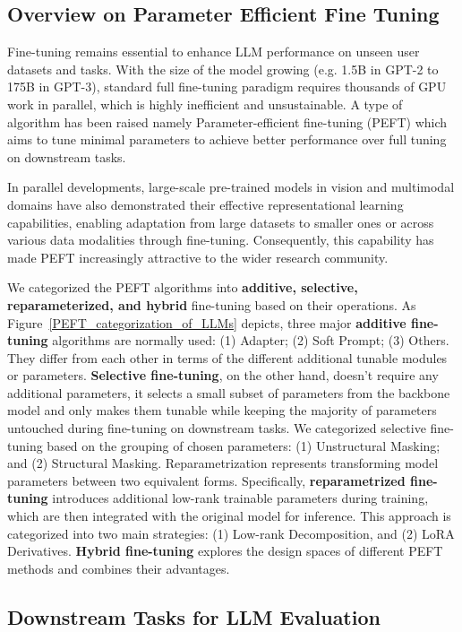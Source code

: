 \subsection{Overview on Parameter Efficient Fine Tuning}
\label{sec:backgroundofpeft}
Fine-tuning remains essential to enhance LLM performance on unseen user datasets and tasks. With the size of the model growing (e.g. 1.5B in GPT-2 to 175B in GPT-3), standard full fine-tuning
paradigm requires thousands of GPU work in parallel, which is highly inefficient and unsustainable. A type of algorithm has been raised namely Parameter-efficient fine-tuning (PEFT) which aims to tune minimal parameters to achieve better performance over full tuning on downstream tasks.

In parallel developments, large-scale pre-trained models in vision and multimodal domains have also demonstrated their effective representational learning capabilities, enabling adaptation from large datasets to smaller ones or across various data modalities through fine-tuning. Consequently, this capability has made PEFT increasingly attractive to the wider research community.


We categorized the PEFT algorithms into \textbf{additive, selective, reparameterized, and hybrid} fine-tuning based on their operations. As Figure~\ref{PEFT_categorization_of_LLMs} depicts, three major \textbf{additive fine-tuning} algorithms are normally used: (1) Adapter; (2) Soft Prompt; (3) Others. They differ from each other in terms of the different additional tunable modules or parameters. \textbf{Selective fine-tuning}, on the other hand, doesn't require any additional parameters, it selects a small subset of parameters from the backbone model and only makes them tunable while keeping the majority of parameters untouched during fine-tuning on downstream tasks. We categorized selective fine-tuning based on the grouping of chosen parameters: (1) Unstructural Masking; and (2) Structural Masking. Reparametrization represents transforming model parameters between two equivalent forms. Specifically, \textbf{reparametrized fine-tuning} introduces additional low-rank trainable parameters during training, which are then integrated with the original model for inference. This approach is categorized into two main strategies: (1) Low-rank Decomposition, and (2) LoRA Derivatives. 
\textbf{Hybrid fine-tuning} explores the design spaces of different PEFT methods and combines their advantages.

\subsection{Downstream Tasks for LLM Evaluation}
\label{sec: downstream dataset}

